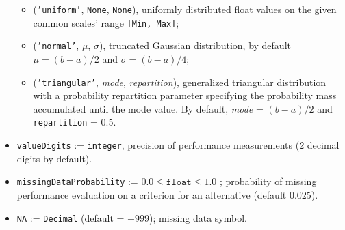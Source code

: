 \begin{itemize}[leftmargin=0.5cm,rightmargin=0.5cm]
\begin{itemize}[rightmargin=1cm]
         \item  (\texttt{'uniform'}, \texttt{None}, \texttt{None}), uniformly distributed float values on the given common scales' range \texttt{[Min, Max]};
         \item (\texttt{'normal'}, $\mu$, $\sigma$), truncated Gaussian distribution, by default $\mu = (b-a)/2$ and $\sigma = (b-a)/4$;
         \item (\texttt{'triangular'}, \emph{mode}, \emph{repartition}), generalized triangular distribution with a probability repartition parameter specifying the probability mass accumulated until the mode value. By default, \emph{mode} = $(b-a)/2$ and \texttt{repartition} = $0.5$.
      \end{itemize}
\item \texttt{valueDigits} := \texttt{integer}, precision of performance measurements (2 decimal digits by default).
\item \texttt{missingDataProbability} := $0.0 \leq \mathtt{float} \leq 1.0$ ; probability of missing performance evaluation on a criterion for an alternative (default $0.025$).
\item \texttt{NA} := \texttt{Decimal} (default = $-999$); missing data symbol. 
\end{itemize} 

